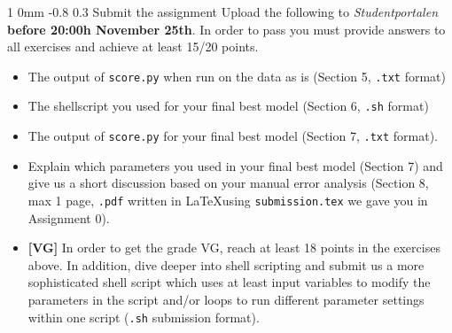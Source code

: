 \documentclass[11pt]{article}
\makeatletter
\newcommand{\newsec}[2]{\section{#1}\label{sec:#2}\noindent}
\renewcommand{\section}{\@startsection
{section}%
{1}%
{0mm}%
{-0.8\baselineskip}%
{0.3\baselineskip}%
{\bfseries\large}}%
\makeatother
\begin{document}
\newsec{Submit the assignment}{submit}%
Upload the following to {\it Studentportalen}
\textbf{before 20:00h November 25th}. In order to pass you must
provide answers to all exercises and achieve at least 15/20 points.
\begin{itemize}[noitemsep,topsep=0.2cm]
\item The output of {\tt score.py} when run on the data as is (Section
  5, \texttt{.txt} format)
\item The shellscript you used for your final best model (Section 6,
  \texttt{.sh} format)
\item The output of {\tt score.py} for your final best model (Section
  7, \texttt{.txt} format).
\item Explain which parameters you used in your final best model
  (Section 7) and give us a short discussion based on your manual
  error analysis (Section 8, max 1 page, \texttt{.pdf} written in
  \LaTeX using \texttt{submission.tex} we gave you in Assignment 0).
\item \textbf{[VG]} In order to get the grade VG, reach at least 18
  points in the exercises above. In addition, dive deeper into shell
  scripting and submit us a more sophisticated shell script which uses
  at least input variables to modify the parameters in the script
  and/or loops to run different parameter settings within one script
  (\texttt{.sh} submission format).
\end{itemize}
\end{document}
